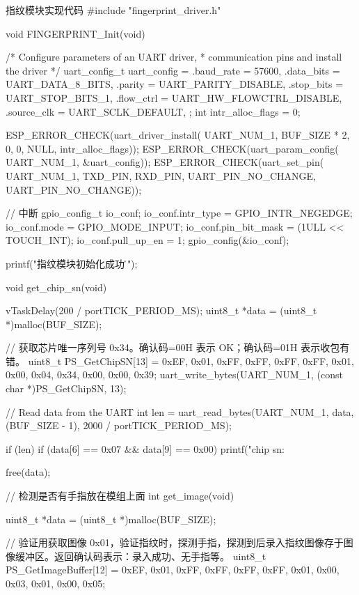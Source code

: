 \documentclass[lang=cn,newtx,10pt,scheme=chinese]{elegantbook}
\begin{document}
\begin{mycode}{指纹模块实现代码}
#include "fingerprint_driver.h"

void FINGERPRINT_Init(void)
{
    /* Configure parameters of an UART driver,
     * communication pins and install the driver */
    uart_config_t uart_config = {
        .baud_rate = 57600,
        .data_bits = UART_DATA_8_BITS,
        .parity = UART_PARITY_DISABLE,
        .stop_bits = UART_STOP_BITS_1,
        .flow_ctrl = UART_HW_FLOWCTRL_DISABLE,
        .source_clk = UART_SCLK_DEFAULT,
    };
    int intr_alloc_flags = 0;

    ESP_ERROR_CHECK(uart_driver_install(
        UART_NUM_1,
        BUF_SIZE * 2, 0, 0, NULL,
        intr_alloc_flags));
    ESP_ERROR_CHECK(uart_param_config(
        UART_NUM_1, &uart_config));
    ESP_ERROR_CHECK(uart_set_pin(
        UART_NUM_1,
        TXD_PIN,
        RXD_PIN,
        UART_PIN_NO_CHANGE,
        UART_PIN_NO_CHANGE));

    // 中断
    gpio_config_t io_conf;
    io_conf.intr_type = GPIO_INTR_NEGEDGE;
    io_conf.mode = GPIO_MODE_INPUT;
    io_conf.pin_bit_mask = (1ULL << TOUCH_INT);
    io_conf.pull_up_en = 1;
    gpio_config(&io_conf);

    printf("指纹模块初始化成功。\r\n");
}

void get_chip_sn(void)
{
    vTaskDelay(200 / portTICK_PERIOD_MS);
    uint8_t *data = (uint8_t *)malloc(BUF_SIZE);

    // 获取芯片唯一序列号 0x34。确认码=00H 表示 OK；确认码=01H 表示收包有错。
    uint8_t PS_GetChipSN[13] = {0xEF, 0x01, 0xFF, 0xFF, 0xFF, 0xFF, 0x01, 0x00, 0x04, 0x34, 0x00, 0x00, 0x39};
    uart_write_bytes(UART_NUM_1, (const char *)PS_GetChipSN, 13);

    // Read data from the UART
    int len = uart_read_bytes(UART_NUM_1, data, (BUF_SIZE - 1), 2000 / portTICK_PERIOD_MS);

    if (len)
    {
        if (data[6] == 0x07 && data[9] == 0x00)
        {
            printf("chip sn: %
        }
    }

    free(data);
}

// 检测是否有手指放在模组上面
int get_image(void)
{
    uint8_t *data = (uint8_t *)malloc(BUF_SIZE);

    // 验证用获取图像 0x01，验证指纹时，探测手指，探测到后录入指纹图像存于图像缓冲区。返回确认码表示：录入成功、无手指等。
    uint8_t PS_GetImageBuffer[12] = {0xEF, 0x01, 0xFF, 0xFF, 0xFF, 0xFF, 0x01, 0x00, 0x03, 0x01, 0x00, 0x05};

}
\end{mycode}
\end{document}
